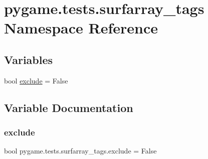 \hypertarget{namespacepygame_1_1tests_1_1surfarray__tags}{}\section{pygame.\+tests.\+surfarray\+\_\+tags Namespace Reference}
\label{namespacepygame_1_1tests_1_1surfarray__tags}
\subsection*{Variables}
\begin{DoxyCompactItemize}
\item 
bool \hyperlink{namespacepygame_1_1tests_1_1surfarray__tags_a95a3f4812a0e1698ec10403f7e0414db}{exclude} = False
\end{DoxyCompactItemize}


\subsection{Variable Documentation}
\mbox{\label{namespacepygame_1_1tests_1_1surfarray__tags_a95a3f4812a0e1698ec10403f7e0414db}} 
\subsubsection{\texorpdfstring{exclude}{exclude}}
{\footnotesize\ttfamily bool pygame.\+tests.\+surfarray\+\_\+tags.\+exclude = False}

